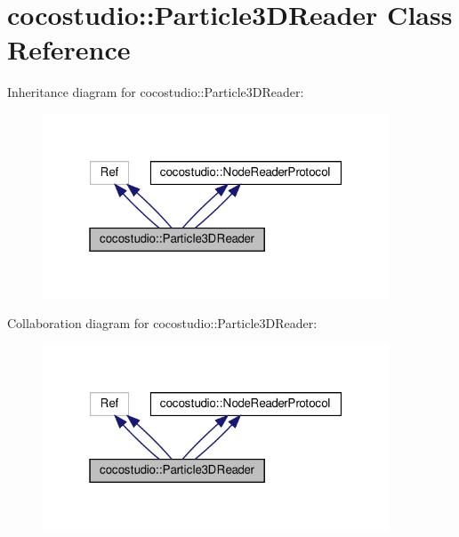 \hypertarget{classcocostudio_1_1Particle3DReader}{}\section{cocostudio\+:\+:Particle3\+D\+Reader Class Reference}
\label{classcocostudio_1_1Particle3DReader}


Inheritance diagram for cocostudio\+:\+:Particle3\+D\+Reader\+:
\nopagebreak
\begin{figure}[H]
\begin{center}
\leavevmode
\includegraphics[width=292pt]{classcocostudio_1_1Particle3DReader__inherit__graph}
\end{center}
\end{figure}


Collaboration diagram for cocostudio\+:\+:Particle3\+D\+Reader\+:
\nopagebreak
\begin{figure}[H]
\begin{center}
\leavevmode
\includegraphics[width=292pt]{classcocostudio_1_1Particle3DReader__coll__graph}
\end{center}
\end{figure}
